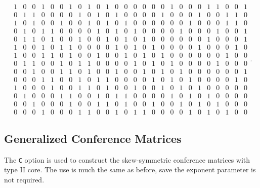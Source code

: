\documentclass[a4paper,10pt]{article}
\begin{document}
\[\begin{array}{rrrrrrrrrrrrrrrrrrrrrrrrrr}
1 & 0 & 0 & 1 & 0 & 0 & 1 & 0 & 1 & 0 & 1 & 0 & 0 & 0 & 0 & 0 & 0 & 1 & 0 & 0 & 0 & 1 & 1 & 0 & 0 & 1 \\
0 & 1 & 1 & 0 & 0 & 0 & 0 & 1 & 0 & 1 & 0 & 1 & 0 & 0 & 0 & 0 & 1 & 0 & 0 & 0 & 1 & 0 & 0 & 1 & 1 & 0 \\
1 & 0 & 1 & 0 & 0 & 1 & 0 & 0 & 1 & 0 & 1 & 0 & 1 & 0 & 0 & 0 & 0 & 0 & 0 & 1 & 0 & 0 & 0 & 1 & 1 & 0 \\
0 & 1 & 0 & 1 & 1 & 0 & 0 & 0 & 0 & 1 & 0 & 1 & 0 & 1 & 0 & 0 & 0 & 0 & 1 & 0 & 0 & 0 & 1 & 0 & 0 & 1 \\
0 & 1 & 1 & 0 & 1 & 0 & 0 & 1 & 0 & 0 & 1 & 0 & 1 & 0 & 1 & 0 & 0 & 0 & 0 & 0 & 0 & 1 & 0 & 0 & 0 & 1 \\
1 & 0 & 0 & 1 & 0 & 1 & 1 & 0 & 0 & 0 & 0 & 1 & 0 & 1 & 0 & 1 & 0 & 0 & 0 & 0 & 1 & 0 & 0 & 0 & 1 & 0 \\
1 & 0 & 0 & 1 & 1 & 0 & 1 & 0 & 0 & 1 & 0 & 0 & 1 & 0 & 1 & 0 & 1 & 0 & 0 & 0 & 0 & 0 & 0 & 1 & 0 & 0 \\
0 & 1 & 1 & 0 & 0 & 1 & 0 & 1 & 1 & 0 & 0 & 0 & 0 & 1 & 0 & 1 & 0 & 1 & 0 & 0 & 0 & 0 & 1 & 0 & 0 & 0 \\
0 & 0 & 1 & 0 & 0 & 1 & 1 & 0 & 1 & 0 & 0 & 1 & 0 & 0 & 1 & 0 & 1 & 0 & 1 & 0 & 0 & 0 & 0 & 0 & 0 & 1 \\
0 & 0 & 0 & 1 & 1 & 0 & 0 & 1 & 0 & 1 & 1 & 0 & 0 & 0 & 0 & 1 & 0 & 1 & 0 & 1 & 0 & 0 & 0 & 0 & 1 & 0 \\
1 & 0 & 0 & 0 & 1 & 0 & 0 & 1 & 1 & 0 & 1 & 0 & 0 & 1 & 0 & 0 & 1 & 0 & 1 & 0 & 1 & 0 & 0 & 0 & 0 & 0 \\
0 & 1 & 0 & 0 & 0 & 1 & 1 & 0 & 0 & 1 & 0 & 1 & 1 & 0 & 0 & 0 & 0 & 1 & 0 & 1 & 0 & 1 & 0 & 0 & 0 & 0 \\
0 & 0 & 1 & 0 & 0 & 0 & 1 & 0 & 0 & 1 & 1 & 0 & 1 & 0 & 0 & 1 & 0 & 0 & 1 & 0 & 1 & 0 & 1 & 0 & 0 & 0 \\
0 & 0 & 0 & 1 & 0 & 0 & 0 & 1 & 1 & 0 & 0 & 1 & 0 & 1 & 1 & 0 & 0 & 0 & 0 & 1 & 0 & 1 & 0 & 1 & 0 & 0
\end{array}.
\]

\subsection{\sc Generalized Conference Matrices}
The {\tt C} option is used to construct the skew-symmetric conference matrices with type II core. The use is much the same as before, save the exponent parameter is not required.
\end{document}
